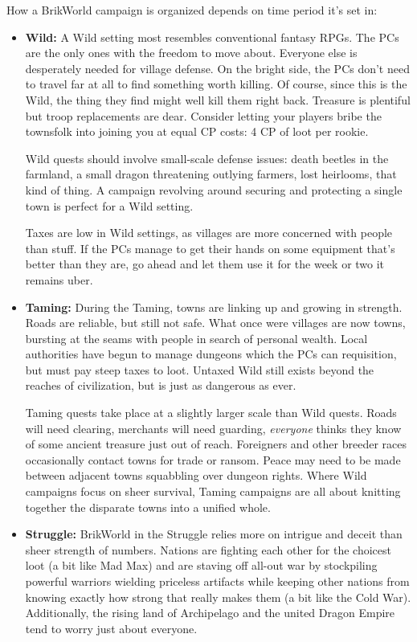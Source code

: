 \documentclass[12pt,a4paper,twocolumn]{article}
\begin{document}
How a BrikWorld campaign is organized depends on time period it's set in:
\begin{itemize}
\item {\bf Wild:} A Wild setting most resembles conventional fantasy RPGs.  The PCs are the only ones with the freedom to move about.  Everyone else is desperately needed for village defense.  On the bright side, the PCs don't need to travel far at all to find something worth killing.  Of course, since this is the Wild, the thing they find might well kill them right back.  Treasure is plentiful but troop replacements are dear.  Consider letting your players bribe the townsfolk into joining you at equal CP costs: 4 CP of loot per rookie.  

Wild quests should involve small-scale defense issues: death beetles in the farmland, a small dragon threatening outlying farmers, lost heirlooms, that kind of thing.  A campaign revolving around securing and protecting a single town is perfect for a Wild setting.

Taxes are low in Wild settings, as villages are more concerned with people than stuff.  If the PCs manage to get their hands on some equipment that's better than they are, go ahead and let them use it for the week or two it remains uber.  

\item {\bf Taming:} During the Taming, towns are linking up and growing in strength.  Roads are reliable, but still not safe.  What once were villages are now towns, bursting at the seams with people in search of personal wealth.  Local authorities have begun to manage dungeons which the PCs can requisition, but must pay steep taxes to loot. Untaxed Wild still exists beyond the reaches of civilization, but is just as dangerous as ever.  

Taming quests take place at a slightly larger scale than Wild quests.  Roads will need clearing, merchants will need guarding, {\it everyone} thinks they know of some ancient treasure just out of reach.  Foreigners and other breeder races occasionally contact towns for trade or ransom.  Peace may need to be made between adjacent towns squabbling over dungeon rights.  Where Wild campaigns focus on sheer survival, Taming campaigns are all about knitting together the disparate towns into a unified whole.

\item {\bf Struggle:} BrikWorld in the Struggle relies more on intrigue and deceit than sheer strength of numbers.  Nations are fighting each other for the choicest loot (a bit like Mad Max) and are staving off all-out war by stockpiling powerful warriors wielding priceless artifacts while keeping other nations from knowing exactly how strong that really makes them (a bit like the Cold War).  Additionally, the rising land of Archipelago and the united Dragon Empire tend to worry just about everyone.


\end{itemize}
\end{document}

